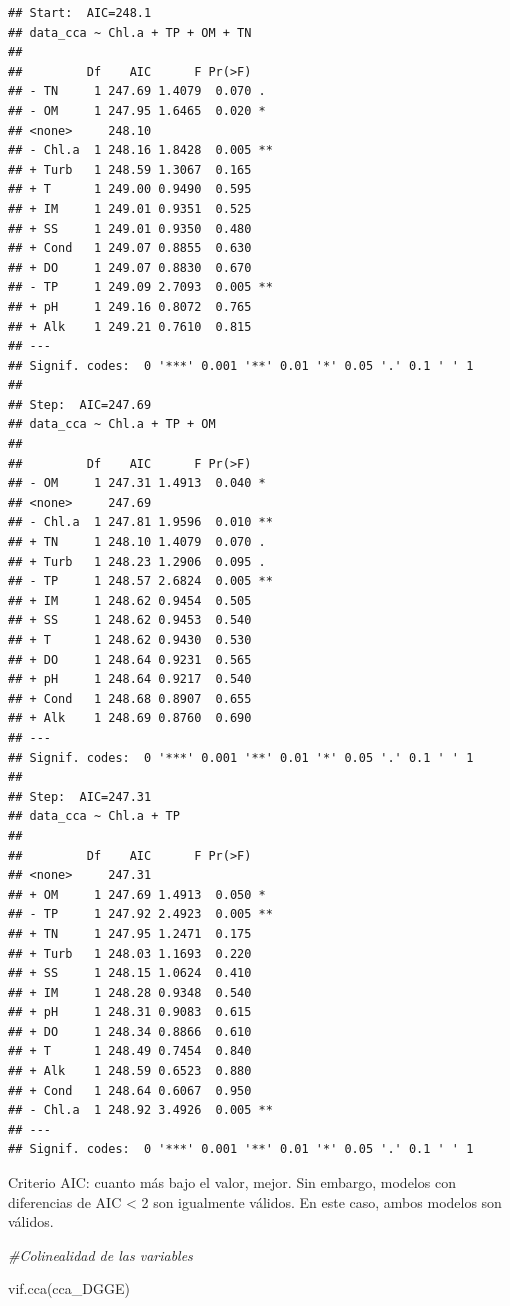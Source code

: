 \documentclass[
]{book}
\newenvironment{Shaded}{\begin{snugshade}}{\end{snugshade}}
\newcommand{\CommentTok}[1]{\textcolor[rgb]{0.56,0.35,0.01}{\textit{#1}}}
\newcommand{\FunctionTok}[1]{\textcolor[rgb]{0.00,0.00,0.00}{#1}}
\newcommand{\NormalTok}[1]{#1}
\begin{document}
\begin{verbatim}
## Start:  AIC=248.1
## data_cca ~ Chl.a + TP + OM + TN
## 
##         Df    AIC      F Pr(>F)   
## - TN     1 247.69 1.4079  0.070 . 
## - OM     1 247.95 1.6465  0.020 * 
## <none>     248.10                 
## - Chl.a  1 248.16 1.8428  0.005 **
## + Turb   1 248.59 1.3067  0.165   
## + T      1 249.00 0.9490  0.595   
## + IM     1 249.01 0.9351  0.525   
## + SS     1 249.01 0.9350  0.480   
## + Cond   1 249.07 0.8855  0.630   
## + DO     1 249.07 0.8830  0.670   
## - TP     1 249.09 2.7093  0.005 **
## + pH     1 249.16 0.8072  0.765   
## + Alk    1 249.21 0.7610  0.815   
## ---
## Signif. codes:  0 '***' 0.001 '**' 0.01 '*' 0.05 '.' 0.1 ' ' 1
## 
## Step:  AIC=247.69
## data_cca ~ Chl.a + TP + OM
## 
##         Df    AIC      F Pr(>F)   
## - OM     1 247.31 1.4913  0.040 * 
## <none>     247.69                 
## - Chl.a  1 247.81 1.9596  0.010 **
## + TN     1 248.10 1.4079  0.070 . 
## + Turb   1 248.23 1.2906  0.095 . 
## - TP     1 248.57 2.6824  0.005 **
## + IM     1 248.62 0.9454  0.505   
## + SS     1 248.62 0.9453  0.540   
## + T      1 248.62 0.9430  0.530   
## + DO     1 248.64 0.9231  0.565   
## + pH     1 248.64 0.9217  0.540   
## + Cond   1 248.68 0.8907  0.655   
## + Alk    1 248.69 0.8760  0.690   
## ---
## Signif. codes:  0 '***' 0.001 '**' 0.01 '*' 0.05 '.' 0.1 ' ' 1
## 
## Step:  AIC=247.31
## data_cca ~ Chl.a + TP
## 
##         Df    AIC      F Pr(>F)   
## <none>     247.31                 
## + OM     1 247.69 1.4913  0.050 * 
## - TP     1 247.92 2.4923  0.005 **
## + TN     1 247.95 1.2471  0.175   
## + Turb   1 248.03 1.1693  0.220   
## + SS     1 248.15 1.0624  0.410   
## + IM     1 248.28 0.9348  0.540   
## + pH     1 248.31 0.9083  0.615   
## + DO     1 248.34 0.8866  0.610   
## + T      1 248.49 0.7454  0.840   
## + Alk    1 248.59 0.6523  0.880   
## + Cond   1 248.64 0.6067  0.950   
## - Chl.a  1 248.92 3.4926  0.005 **
## ---
## Signif. codes:  0 '***' 0.001 '**' 0.01 '*' 0.05 '.' 0.1 ' ' 1
\end{verbatim}

Criterio AIC: cuanto más bajo el valor, mejor. Sin embargo, modelos con diferencias de AIC \textless{} 2 son igualmente válidos. En este caso, ambos modelos son válidos.

\begin{Shaded}
\begin{Highlighting}[]
\CommentTok{\#Colinealidad de las variables}

\FunctionTok{vif.cca}\NormalTok{(cca\_DGGE)}
\end{Highlighting}
\end{Shaded}
\end{document}

